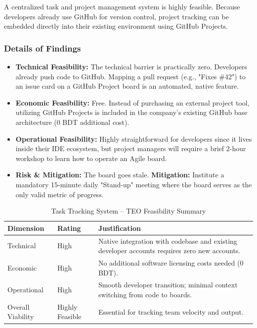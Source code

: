 \documentclass[12pt,a4paper]{report}
\begin{document}
\begin{summaryBox}
A centralized task and project management system is highly feasible. Because developers already use GitHub for version control, project tracking can be embedded directly into their existing environment using GitHub Projects.
\end{summaryBox}

\subsubsection{Details of Findings}

\begin{itemize}[leftmargin=*]
    \item \textbf{Technical Feasibility:} The technical barrier is practically zero. Developers already push code to GitHub. Mapping a pull request (e.g., "Fixes \#42") to an issue card on a GitHub Project board is an automated, native feature.
    \item \textbf{Economic Feasibility:} Free. Instead of purchasing an external project tool, utilizing GitHub Projects is included in the company's existing GitHub base architecture (0 BDT additional cost).
    \item \textbf{Operational Feasibility:} Highly straightforward for developers since it lives inside their IDE ecosystem, but project managers will require a brief 2-hour workshop to learn how to operate an Agile board.
    \item \textbf{Risk \& Mitigation:} The board goes stale. \textbf{Mitigation:} Institute a mandatory 15-minute daily "Stand-up" meeting where the board serves as the only valid metric of progress.
\end{itemize}

\begin{table}[H]
\centering
\renewcommand{\arraystretch}{1.3}
\begin{tabularx}{\textwidth}{|p{3cm}|p{2.5cm}|X|}
\hline
\rowcolor{secondary}
\textbf{Dimension} & \textbf{Rating} & \textbf{Justification} \\
\hline
Technical & High & Native integration with codebase and existing developer accounts requires zero new accounts. \\
\hline
Economic & High & No additional software licensing costs needed (0 BDT). \\
\hline
Operational & High & Smooth developer transition; minimal context switching from code to boards. \\
\hline
Overall Viability & Highly Feasible & Essential for tracking team velocity and output. \\
\hline
\end{tabularx}
\caption{Task Tracking System -- TEO Feasibility Summary}
\end{table}
\end{document}
